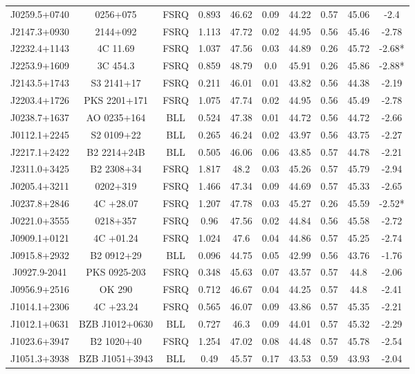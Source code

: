 \documentclass[12pt]{article}
\begin{document}
\begin{landscape}
\begin{longtable}{cccccccccc}
J0259.5+0740 & 0256+075 & FSRQ & 0.893 & 46.62 & 0.09 & 44.22 & 0.57 & 45.06 & -2.4 \\
J2147.3+0930 & 2144+092 & FSRQ & 1.113 & 47.72 & 0.02 & 44.95 & 0.56 & 45.46 & -2.78 \\
J2232.4+1143 & 4C 11.69 & FSRQ & 1.037 & 47.56 & 0.03 & 44.89 & 0.26 & 45.72 & -2.68* \\
J2253.9+1609 & 3C 454.3 & FSRQ & 0.859 & 48.79 & 0.0 & 45.91 & 0.26 & 45.86 & -2.88* \\
J2143.5+1743 & S3 2141+17 & FSRQ & 0.211 & 46.01 & 0.01 & 43.82 & 0.56 & 44.38 & -2.19 \\
J2203.4+1726 & PKS 2201+171 & FSRQ & 1.075 & 47.74 & 0.02 & 44.95 & 0.56 & 45.49 & -2.78 \\
J0238.7+1637 & AO 0235+164 & BLL & 0.524 & 47.38 & 0.01 & 44.72 & 0.56 & 44.72 & -2.66 \\
J0112.1+2245 & S2 0109+22 & BLL & 0.265 & 46.24 & 0.02 & 43.97 & 0.56 & 43.75 & -2.27 \\
J2217.1+2422 & B2 2214+24B & BLL & 0.505 & 46.06 & 0.06 & 43.85 & 0.57 & 44.78 & -2.21 \\
J2311.0+3425 & B2 2308+34 & FSRQ & 1.817 & 48.2 & 0.03 & 45.26 & 0.57 & 45.79 & -2.94 \\
J0205.4+3211 & 0202+319 & FSRQ & 1.466 & 47.34 & 0.09 & 44.69 & 0.57 & 45.33 & -2.65 \\
J0237.8+2846 & 4C +28.07 & FSRQ & 1.207 & 47.78 & 0.03 & 45.27 & 0.26 & 45.59 & -2.52* \\
J0221.0+3555 & 0218+357 & FSRQ & 0.96 & 47.56 & 0.02 & 44.84 & 0.56 & 45.58 & -2.72 \\
J0909.1+0121 & 4C +01.24 & FSRQ & 1.024 & 47.6 & 0.04 & 44.86 & 0.57 & 45.25 & -2.74 \\
J0915.8+2932 & B2 0912+29 & BLL & 0.096 & 44.75 & 0.05 & 42.99 & 0.56 & 43.76 & -1.76 \\
J0927.9-2041 & PKS 0925-203 & FSRQ & 0.348 & 45.63 & 0.07 & 43.57 & 0.57 & 44.8 & -2.06 \\
J0956.9+2516 & OK 290 & FSRQ & 0.712 & 46.67 & 0.04 & 44.25 & 0.57 & 44.8 & -2.41 \\
J1014.1+2306 & 4C +23.24 & FSRQ & 0.565 & 46.07 & 0.09 & 43.86 & 0.57 & 45.35 & -2.21 \\
J1012.1+0631 & BZB J1012+0630 & BLL & 0.727 & 46.3 & 0.09 & 44.01 & 0.57 & 45.32 & -2.29 \\
J1023.6+3947 & B2 1020+40 & FSRQ & 1.254 & 47.02 & 0.08 & 44.48 & 0.57 & 45.78 & -2.54 \\
J1051.3+3938 & BZB J1051+3943 & BLL & 0.49 & 45.57 & 0.17 & 43.53 & 0.59 & 43.93 & -2.04 \\

\end{longtable}
\end{landscape}
\end{document}
